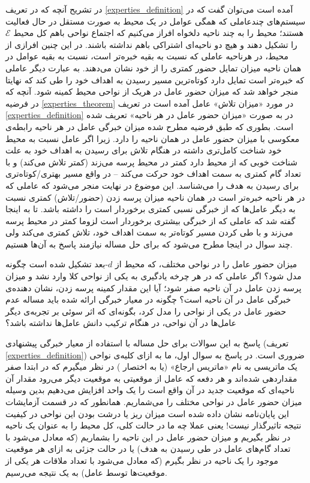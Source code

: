 در تشریح آنچه که در تعریف
\ref{experties_definition}
آمده است می‌توان گفت که در سیستم‌های چندعاملی که همگی عوامل در یک محیط به صورت مستقل در حال فعالیت هستند؛ محیط را به چند ناحیه دلخواه افراز می‌کنیم که اجتماع نواحی باهم کل محیط $\mathcal{E}$ را تشکیل دهند و هیچ دو ناحیه‌ای اشتراکی باهم نداشته باشند. در این چنین افرازی از محیط، در هرناحیه عاملی که نسبت به بقیه خبره‌تر است، نسبت به بقیه عوامل در همان ناحیه میزان تمایل حضور کمتری را از خود نشان می‌دهند. به عبارت دیگر عاملی که خبره‌تر است تمایل دارد کوتاه‌ترین مسیر رسیدن به اهداف خود را طی کند که نهایتا منجر خواهد شد که میزان حضور عامل در هریک از نواحی محیط کمینه شود.
آنچه که در فرضیه
\ref{experties_theorem}
در مورد «میزان تلاش» عامل آمده است در تعریف
\ref{experties_definition}
در به صورت «میزان حضور عامل در هر ناحیه» تعریف شده است. بطوری که طبق فرضیه مطرح شده میزان خبرگی عامل در هر ناحیه رابطه‌ی معکوسی با میزان حضور عامل در همان ناحیه را دارد. زیرا اگر عامل نسبت به محیط خود شناخت کامل‌تری داشته در هنگام تلاش برای رسیدن به اهداف خود به علت شناخت خوبی که از محیط دارد کمتر در محیط پرسه می‌زند (کمتر تلاش می‌کند) و با تعداد گام کمتری به سمت اهداف خود حرکت می‌کند -- در واقع مسیر بهتری/کوتاه‌تری برای رسیدن به هدف را می‌شناسد. این موضوع در نهایت منجر می‌شود که عاملی که در هر ناحیه خبره‌تر است در همان ناحیه میزان پرسه زدن (حضور/تلاش) کمتری نسبت به دیگر عامل‌ها که از خبرگی نسبی کمتری برخوردار است را داشته باشد.
تا به اینجا گفته شد که عاملی که از خبرگی بیشتری برخوردار است لزوما کمتر در محیط پرسه می‌زند و با طی کردن مسیر کوتاه‌تر به سمت اهداف خود، تلاش کمتری می‌کند ولی چند سوال در اینجا مطرح می‌شود که برای حل مساله نیازمند پاسخ به آن‌ها هستیم.
\begin{enumerate}
 میزان حضور عامل را در نواحی مختلف، که محیط از $d$-بعد تشکیل شده است چگونه مدل شود؟
 اگر عاملی که در هر چرخه یادگیری به یکی از نواحی کلا وارد نشد و میزان پرسه زدن عامل در آن ناحیه صفر شود؛ آیا این مقدار کمینه پرسه زدن، نشان دهنده‌ی خبرگی عامل در آن ناحیه است؟
 چگونه در معیار خبرگی ارائه شده باید مساله عدم حضور عامل در یکی از نواحی را مدل کرد، بگونه‌ای که اثر سوئی بر تجربه‌ی دیگر عامل‌ها در آن نواحی، در هنگام ترکیب دانش عامل‌ها نداشته باشد؟
\end{enumerate}
پاسخ به این سوالات برای حل مساله با استفاده از معیار خبرگی پیشنهادی (تعریف \ref{experties_definition}) ضروری است. در پاسخ به سوال اول، ما به ازای کلیه‌ی نواحی یک ماتریسی به نام «ماتریس ارجاع» (یا به اختصار ) در نظر میگیرم که در ابتدا صفر مقداردهی شده‌اند و هر دفعه که عامل از موقعیتی‌ به موقعیت دیگر می‌رود مقدار آن ناحیه‌ای که موقعیت جدید در آن واقع است را یک واحد افزایش می‌دهیم بدین وسیله میزان حضور عامل در نواحی مختلف را می‌شماریم. همانطور که در قسمت آزمایشات این پایان‌نامه نشان داده شده است میزان ریز یا درشت بودن این نواحی در کیفیت نتیجه تاثیرگذار نیست! یعنی عملا چه ما در حالت کلی، کل محیط را به عنوان یک ناحیه در نظر بگیریم و میزان حضور عامل در این ناحیه را بشماریم (که معادل می‌شود با تعداد گام‌های عامل در طی رسیدن به هدف) یا در حالت جزئی به ازای هر موقعیت موجود را یک ناحیه در نظر بگیرم (که معادل می‌شود با تعداد ملاقات هر یکی از موقعیت‌ها توسط عامل) به یک نتیجه می‌رسیم.
